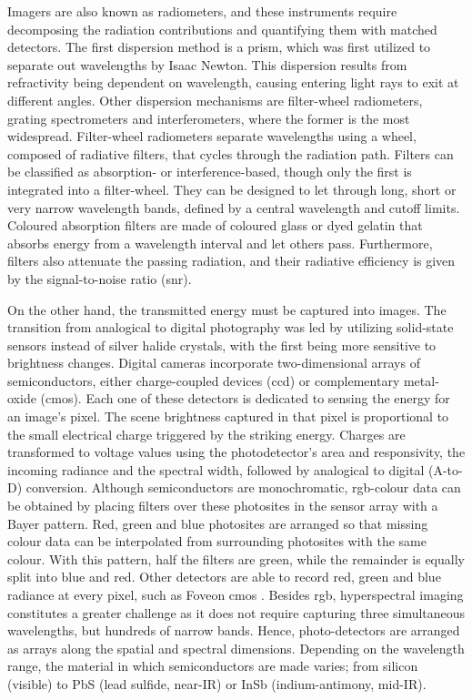Imagers are also known as radiometers, and these instruments require decomposing the radiation contributions and quantifying them with matched detectors. The first dispersion method is a prism, which was first utilized to separate out wavelengths by Isaac Newton. This dispersion results from refractivity being dependent on wavelength, causing entering light rays to exit at different angles. Other dispersion mechanisms are filter-wheel radiometers, grating spectrometers and interferometers, where the former is the most widespread. Filter-wheel radiometers separate wavelengths using a wheel, composed of radiative filters, that cycles through the radiation path. Filters can be classified as absorption- or interference-based, though only the first is integrated into a filter-wheel. They can be designed to let through long, short or very narrow wavelength bands, defined by a central wavelength and cutoff limits. Coloured absorption filters are made of coloured glass or dyed gelatin that absorbs energy from a wavelength interval and let others pass. Furthermore, filters also attenuate the passing radiation, and their radiative efficiency is given by the signal-to-noise ratio (\acrshort{snr}).

On the other hand, the transmitted energy must be captured into images. The transition from analogical to digital photography was led by utilizing solid-state sensors instead of silver halide crystals, with the first being more sensitive to brightness changes. Digital cameras incorporate two-dimensional arrays of semiconductors, either charge-coupled devices (\acrshort{ccd}) or complementary metal-oxide (\acrshort{cmos}). Each one of these detectors is dedicated to sensing the energy for an image's pixel. The scene brightness captured in that pixel is proportional to the small electrical charge triggered by the striking energy. Charges are transformed to voltage values using the photodetector's area and responsivity, the incoming radiance and the spectral width, followed by analogical to digital (A-to-D) conversion. Although semiconductors are monochromatic, \acrshort{rgb}-colour data can be obtained by placing filters over these photosites in the sensor array with a Bayer pattern. Red, green and blue photosites are arranged so that missing colour data can be interpolated from surrounding photosites with the same colour. With this pattern, half the filters are green, while the remainder is equally split into blue and red. Other detectors are able to record red, green and blue radiance at every pixel, such as Foveon \acrshort{cmos} \cite{lillesand_remote_2015}. Besides \acrshort{rgb}, hyperspectral imaging constitutes a greater challenge as it does not require capturing three simultaneous wavelengths, but hundreds of narrow bands. Hence, photo-detectors are arranged as arrays along the spatial and spectral dimensions. Depending on the wavelength range, the material in which semiconductors are made varies; from silicon (visible) to PbS (lead sulfide, near-IR) or InSb (indium-antimony, mid-IR). 

